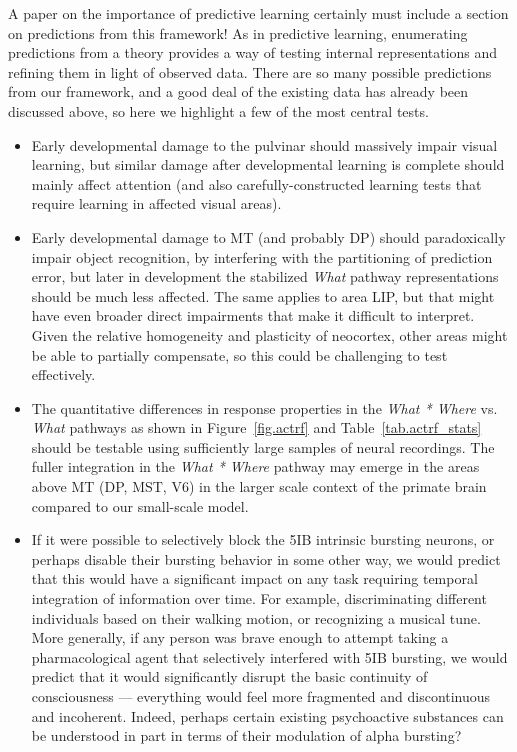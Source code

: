 \documentclass[11pt,twoside]{article}
\newif\myifpdf
\begin{document}
A paper on the importance of predictive learning certainly must include a section on predictions from this framework!  As in predictive learning, enumerating predictions from a theory provides a way of testing internal representations and refining them in light of observed data.  There are so many possible predictions from our framework, and a good deal of the existing data has already been discussed above, so here we highlight a few of the most central tests.

\begin{itemize}
\item Early developmental damage to the pulvinar should massively impair visual learning, but similar damage after developmental learning is complete should mainly affect attention (and also carefully-constructed learning tests that require learning in affected visual areas).
\item Early developmental damage to MT (and probably DP) should paradoxically impair object recognition, by interfering with the partitioning of prediction error, but later in development the stabilized {\em What} pathway representations should be much less affected.  The same applies to area LIP, but that might have even broader direct impairments that make it difficult to interpret.  Given the relative homogeneity and plasticity of neocortex, other areas might be able to partially compensate, so this could be challenging to test effectively.
\item The quantitative differences in response properties in the {\em What * Where} vs. {\em What} pathways as shown in Figure~\ref{fig.actrf} and Table~\ref{tab.actrf_stats} should be testable using sufficiently large samples of neural recordings.  The fuller integration in the {\em What * Where} pathway may emerge in the areas above MT (DP, MST, V6) in the larger scale context of the primate brain compared to our small-scale model.
\item If it were possible to selectively block the 5IB intrinsic bursting neurons, or perhaps disable their bursting behavior in some other way, we would predict that this would have a significant impact on any task requiring temporal integration of information over time.  For example, discriminating different individuals based on their walking motion, or recognizing a musical tune.  More generally, if any person was brave enough to attempt taking a pharmacological agent that selectively interfered with 5IB bursting, we would predict that it would significantly disrupt the basic continuity of consciousness --- everything would feel more fragmented and discontinuous and incoherent.  Indeed, perhaps certain existing psychoactive substances can be understood in part in terms of their modulation of alpha bursting?

\end{itemize}
\end{document}
